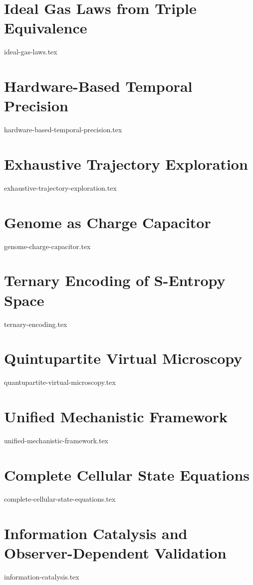 \documentclass[11pt,a4paper]{article}
\theoremstyle{remark}
\begin{document}
\section{Ideal Gas Laws from Triple Equivalence}
{ideal-gas-laws.tex}

\section{Hardware-Based Temporal Precision}
{hardware-based-temporal-precision.tex}

\section{Exhaustive Trajectory Exploration}
{exhaustive-trajectory-exploration.tex}

\section{Genome as Charge Capacitor}
{genome-charge-capacitor.tex}

\section{Ternary Encoding of S-Entropy Space}
{ternary-encoding.tex}

\section{Quintupartite Virtual Microscopy}
{quantupartite-virtual-microscopy.tex}

\section{Unified Mechanistic Framework}
{unified-mechanistic-framework.tex}

\section{Complete Cellular State Equations}
{complete-cellular-state-equations.tex}

\section{Information Catalysis and Observer-Dependent Validation}
{information-catalysis.tex}
\end{document}
